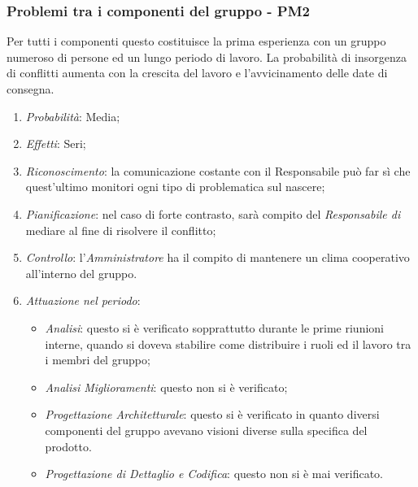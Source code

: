 \subsubsection{Problemi tra i componenti del gruppo - PM2}
Per tutti i componenti questo  costituisce la prima esperienza con un gruppo numeroso di persone ed un lungo periodo di lavoro. La probabilit\`a di insorgenza di conflitti aumenta con la crescita del lavoro e l'avvicinamento delle date di consegna.
\begin{enumerate}
\item \textit{Probabilit\`a}: Media;
\item \textit{Effetti}: Seri;
\item \textit{Riconoscimento}: la comunicazione costante con il Responsabile può far sì che quest’ultimo monitori ogni tipo di problematica sul nascere;
\item \textit{Pianificazione}: nel caso di forte contrasto, sar\`a compito del \textit{Responsabile di } mediare al fine di risolvere il conflitto;
\item \textit{Controllo}: l'\textit{Amministratore} ha il compito di mantenere un clima cooperativo all'interno del gruppo.
\item \textit{Attuazione nel periodo}: 
	\begin{itemize}
	\item \textit{Analisi}: questo  si è verificato sopprattutto durante le prime riunioni interne, quando si doveva stabilire come distribuire i ruoli ed il lavoro tra i membri del gruppo;
	\item \textit{Analisi Miglioramenti}: questo  non si è verificato;
	\item \textit{Progettazione Architetturale}: questo  si è verificato in quanto diversi componenti del gruppo avevano visioni diverse sulla specifica del prodotto.
	\item \textit{Progettazione di Dettaglio e Codifica}: questo  non si è mai verificato.
	\end{itemize}
\end{enumerate} 

